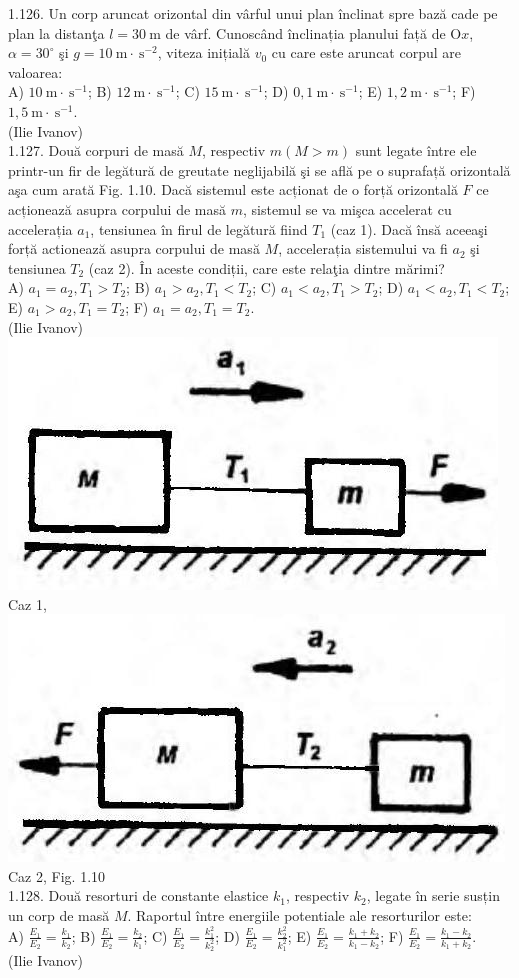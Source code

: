 1.126. Un corp aruncat orizontal din vârful unui plan înclinat spre bază cade pe plan la distanţa $l=30 \mathrm{~m}$ de vârf. Cunoscând înclinația planului față de $\mathrm{O} x$, $\alpha=30^{\circ}$ şi $g=10 \mathrm{~m} \cdot \mathrm{~s}^{-2}$, viteza inițială $v_{0}$ cu care este aruncat corpul are valoarea:\\ A) $10 \mathrm{~m} \cdot \mathrm{~s}^{-1}$; B) $12 \mathrm{~m} \cdot \mathrm{~s}^{-1}$; C) $15 \mathrm{~m} \cdot \mathrm{~s}^{-1}$; D) $0,1 \mathrm{~m} \cdot \mathrm{~s}^{-1}$; E) $1,2 \mathrm{~m} \cdot \mathrm{~s}^{-1}$; F) $1,5 \mathrm{~m} \cdot \mathrm{~s}^{-1}$.\\ (Ilie Ivanov)\\

1.127. Două corpuri de masă $M$, respectiv $m (M>m)$ sunt legate între ele printr-un fir de legătură de greutate neglijabilă şi se află pe o suprafață orizontală aşa cum arată Fig. 1.10. Dacă sistemul este acționat de o forță orizontală $F$ ce acționează asupra corpului de masă $m$, sistemul se va mişca accelerat cu accelerația $a_{1}$, tensiunea în firul de legătură fiind $T_{1}$ (caz 1). Dacă însă aceeaşi forță actionează asupra corpului de masă $M$, accelerația sistemului va fi $a_{2}$ şi tensiunea $T_{2}$ (caz 2). În aceste condiții, care este relaţia dintre mărimi?\\ A) $a_{1}=a_{2}, T_{1}>T_{2}$; B) $a_{1}>a_{2}, T_{1}<T_{2}$; C) $a_{1}<a_{2}, T_{1}>T_{2}$; D) $a_{1}<a_{2}, T_{1}<T_{2}$; E) $a_{1}>a_{2}, T_{1}=T_{2}$; F) $a_{1}=a_{2}, T_{1}=T_{2}$.\\ (Ilie Ivanov)\\ \includegraphics[width=0.4\linewidth]{images/2025_07_01_5b3ff9fa0d508c8e9f17g-031(1)} Caz 1, \includegraphics[width=0.4\linewidth]{images/2025_07_01_5b3ff9fa0d508c8e9f17g-031} Caz 2, Fig. 1.10\\

1.128. Două resorturi de constante elastice $k_{1}$, respectiv $k_{2}$, legate în serie susțin un corp de masă $M$. Raportul între energiile potentiale ale resorturilor este:\\ A) $\frac{E_{1}}{E_{2}}=\frac{k_{1}}{k_{2}}$; B) $\frac{E_{1}}{E_{2}}=\frac{k_{2}}{k_{1}}$; C) $\frac{E_{1}}{E_{2}}=\frac{k_{1}^{2}}{k_{2}^{2}}$; D) $\frac{E_{1}}{E_{2}}=\frac{k_{2}^{2}}{k_{1}^{2}}$; E) $\frac{E_{1}}{E_{2}}=\frac{k_{1}+k_{2}}{k_{1}-k_{2}}$; F) $\frac{E_{1}}{E_{2}}=\frac{k_{1}-k_{2}}{k_{1}+k_{2}}$.\\ (Ilie Ivanov)\\

